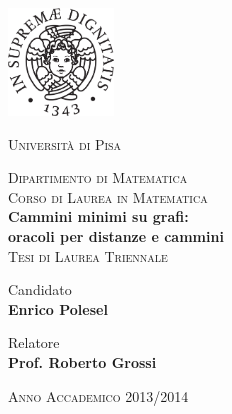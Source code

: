 \begin{titlepage}
\begin{center}


\includegraphics[width=2.8cm]{unipi.pdf}

\vspace{0.5cm}

\textsc{\huge Universit\`a di Pisa}

\vspace{0.5cm}
\textsc{\large Dipartimento di Matematica}\\
\vspace{0.2cm}
\textsc{\Large{Corso di Laurea in Matematica}}\\[3cm]

{\Huge\textbf{Cammini minimi su grafi:\\[0.3cm] oracoli per distanze e
  cammini}}\\[3.5cm]

\textsc{\LARGE Tesi di Laurea Triennale}\\[3cm]

\begin{minipage}{0.45\linewidth}
\begin{center}
{\Large Candidato\\} \vspace{0.1cm} \textbf{{\Large Enrico Polesel}}
\end{center}
\end{minipage}
\hfill
\begin{minipage}{0.45\linewidth}
\begin{center}
{\Large Relatore\\} \vspace{0.1cm} \textbf{{\Large Prof. Roberto Grossi}}
\end{center}
\end{minipage}

\vspace{2cm}
\begin{center}
\textsc{\Large Anno Accademico 2013/2014}
\end{center}
\end{center}
\end{titlepage}
\setcounter{page}{2}

